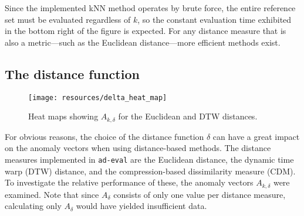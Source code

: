 Since the implemented kNN method operates by brute force, the entire reference set must be evaluated regardless of $k$, so the constant evaluation time exhibited in the bottom right of the figure is expected. For any distance measure that is also a metric---such as the Euclidean distance---more efficient methods exist.

\subsection{The distance function}

\begin{figure}[ht]
    \begin{center}
        \texttt{[image: resources/delta\_heat\_map]}
    \end{center}
    \caption{\small{Heat maps showing $A_{k, \delta}$ for the Euclidean and DTW distances.}}
\label{fig:delta_heat_map}
\end{figure}

For obvious reasons, the choice of the distance function $\delta$ can have a great impact on the anomaly vectors when using distance-based methods. The distance measures implemented in \texttt{ad-eval} are the Euclidean distance, the dynamic time warp (DTW) distance, and the compression-based dissimilarity measure (CDM). To investigate the relative performance of these, the anomaly vectors $A_{k, \delta}$ were examined. Note that since $A_{\delta}$ consists of only one value per distance measure, calculating only $A_\delta$ would have yielded insufficient data.



